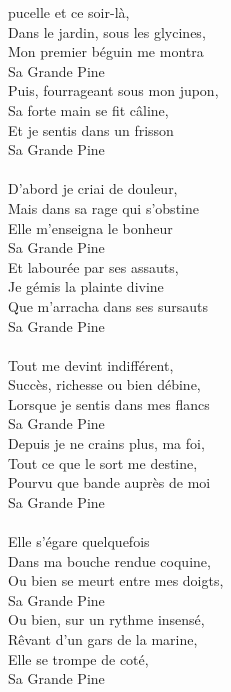 
 pucelle et ce soir-là,
\\Dans le jardin, sous les glycines,
\\Mon premier béguin me montra
\\Sa Grande Pine
\\Puis, fourrageant sous mon jupon,
\\Sa forte main se fit câline,
\\Et je sentis dans un frisson
\\Sa Grande Pine
\\\\D'abord je criai de douleur,
\\Mais dans sa rage qui s'obstine
\\Elle m'enseigna le bonheur
\\Sa Grande Pine
\\Et labourée par ses assauts,
\\Je gémis la plainte divine
\\Que m'arracha dans ses sursauts
\\Sa Grande Pine
\\\\Tout me devint indifférent,
\\Succès, richesse ou bien débine,
\\Lorsque je sentis dans mes flancs
\\Sa Grande Pine
\\Depuis je ne crains plus, ma foi,
\\Tout ce que le sort me destine,
\\Pourvu que bande auprès de moi
\\Sa Grande Pine
\\\\Elle s'égare quelquefois
\\Dans ma bouche rendue coquine,
\\Ou bien se meurt entre mes doigts,
\\Sa Grande Pine
\\Ou bien, sur un rythme insensé,
\\Rêvant d'un gars de la marine,
\\Elle se trompe de coté,
\\Sa Grande Pine
